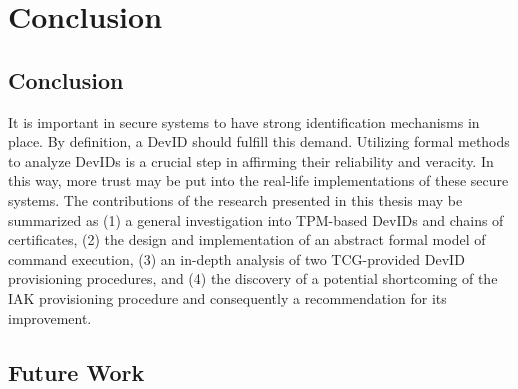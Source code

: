\chapter{Conclusion}


\section{Conclusion}



It is important in secure systems to have strong identification mechanisms in place. By definition, a DevID should fulfill this demand. Utilizing formal methods to analyze DevIDs is a crucial step in affirming their reliability and veracity. In this way, more trust may be put into the real-life implementations of these secure systems.
The contributions of the research presented in this thesis may be summarized as (1) a general investigation into TPM-based DevIDs and chains of certificates, (2) the design and implementation of an abstract formal model of command execution, (3) an in-depth analysis of two TCG-provided DevID provisioning procedures, and (4) the discovery of a potential shortcoming of the IAK provisioning procedure and consequently a recommendation for its improvement.



\section{Future Work}


